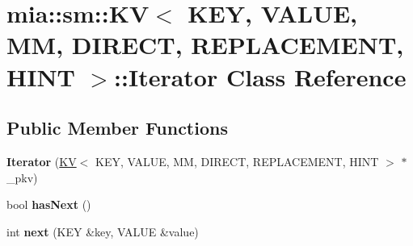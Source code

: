 \hypertarget{classmia_1_1sm_1_1_k_v_3_01_k_e_y_00_01_v_a_l_u_e_00_01_m_m_00_01_d_i_r_e_c_t_00_01_r_e_p_l_a_c_6d8fd61b5ec60406ef5a5d4939c75a12}{\section{mia\-:\-:sm\-:\-:K\-V$<$ K\-E\-Y, V\-A\-L\-U\-E, M\-M, D\-I\-R\-E\-C\-T, R\-E\-P\-L\-A\-C\-E\-M\-E\-N\-T, H\-I\-N\-T $>$\-:\-:Iterator Class Reference}
\label{classmia_1_1sm_1_1_k_v_3_01_k_e_y_00_01_v_a_l_u_e_00_01_m_m_00_01_d_i_r_e_c_t_00_01_r_e_p_l_a_c_6d8fd61b5ec60406ef5a5d4939c75a12}
}
\subsection*{Public Member Functions}
\begin{DoxyCompactItemize}
\item 
\hypertarget{classmia_1_1sm_1_1_k_v_3_01_k_e_y_00_01_v_a_l_u_e_00_01_m_m_00_01_d_i_r_e_c_t_00_01_r_e_p_l_a_c_6d8fd61b5ec60406ef5a5d4939c75a12_ac4eb15ee6c0d906ac623663cf1aa9774}{{\bfseries Iterator} (\hyperlink{classmia_1_1sm_1_1_k_v}{K\-V}$<$ K\-E\-Y, V\-A\-L\-U\-E, M\-M, D\-I\-R\-E\-C\-T, R\-E\-P\-L\-A\-C\-E\-M\-E\-N\-T, H\-I\-N\-T $>$ $\ast$\-\_\-pkv)}\label{classmia_1_1sm_1_1_k_v_3_01_k_e_y_00_01_v_a_l_u_e_00_01_m_m_00_01_d_i_r_e_c_t_00_01_r_e_p_l_a_c_6d8fd61b5ec60406ef5a5d4939c75a12_ac4eb15ee6c0d906ac623663cf1aa9774}

\item 
\hypertarget{classmia_1_1sm_1_1_k_v_3_01_k_e_y_00_01_v_a_l_u_e_00_01_m_m_00_01_d_i_r_e_c_t_00_01_r_e_p_l_a_c_6d8fd61b5ec60406ef5a5d4939c75a12_ace1c65413953f84ce9d0ead2cd5701d4}{bool {\bfseries has\-Next} ()}\label{classmia_1_1sm_1_1_k_v_3_01_k_e_y_00_01_v_a_l_u_e_00_01_m_m_00_01_d_i_r_e_c_t_00_01_r_e_p_l_a_c_6d8fd61b5ec60406ef5a5d4939c75a12_ace1c65413953f84ce9d0ead2cd5701d4}

\item 
\hypertarget{classmia_1_1sm_1_1_k_v_3_01_k_e_y_00_01_v_a_l_u_e_00_01_m_m_00_01_d_i_r_e_c_t_00_01_r_e_p_l_a_c_6d8fd61b5ec60406ef5a5d4939c75a12_acbecb605b01feeb4c1c237af5e104251}{int {\bfseries next} (K\-E\-Y \&key, V\-A\-L\-U\-E \&value)}\label{classmia_1_1sm_1_1_k_v_3_01_k_e_y_00_01_v_a_l_u_e_00_01_m_m_00_01_d_i_r_e_c_t_00_01_r_e_p_l_a_c_6d8fd61b5ec60406ef5a5d4939c75a12_acbecb605b01feeb4c1c237af5e104251}

\end{DoxyCompactItemize}
